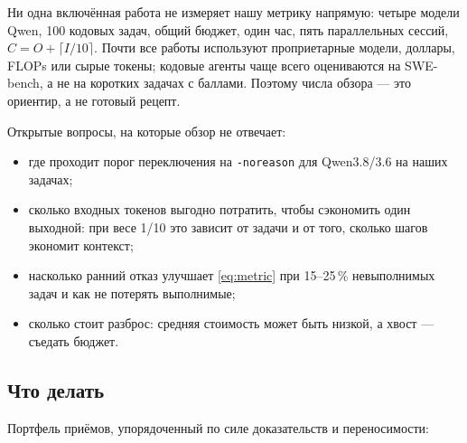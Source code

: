 \documentclass[11pt,a4paper]{article}
\newcommand{\code}[1]{\texttt{#1}}
\begin{document}
Ни одна включённая работа не измеряет нашу метрику напрямую: четыре модели
Qwen, 100 кодовых задач, общий бюджет, один час, пять параллельных сессий,
$C=O+\lceil I/10\rceil$. Почти все работы используют проприетарные модели,
доллары, FLOPs или сырые токены; кодовые агенты чаще всего оцениваются на
SWE-bench, а не на коротких задачах с баллами. Поэтому числа обзора — это
ориентир, а не готовый рецепт.

Открытые вопросы, на которые обзор не отвечает:

\begin{itemize}
  \item где проходит порог переключения на \code{-noreason} для Qwen3.8/3.6
        на наших задачах;
  \item сколько входных токенов выгодно потратить, чтобы сэкономить один
        выходной: при весе 1/10 это зависит от задачи и от того, сколько
        шагов экономит контекст;
  \item насколько ранний отказ улучшает \eqref{eq:metric} при 15--25\,\%
        невыполнимых задач и как не потерять выполнимые;
  \item сколько стоит разброс: средняя стоимость может быть низкой, а
        хвост — съедать бюджет.
\end{itemize}

\subsection{Что делать}

Портфель приёмов, упорядоченный по силе доказательств и переносимости:
\end{document}
